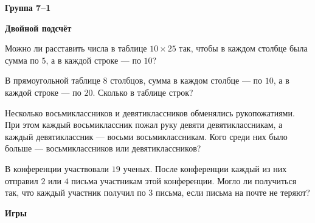 \documentclass{article}
\begin{document}
    \large

    \begin{center}
        \textbf{Группа 7--1}
    \end{center}

    \begin{center}
        \textbf{Двойной подсчёт}
    \end{center}

    \begin{enumerate_boxed}

        \item Можно ли расставить числа в таблице $10 \times 25$ так, чтобы в каждом столбце была сумма по $5$, а в каждой строке — по $10$?

        \item В прямоугольной таблице $8$ столбцов, сумма в каждом столбце — по $10$, а в каждой строке — по $20$.
        Сколько в таблице строк?

        \item Несколько восьмиклассников и девятиклассников обменялись рукопожатиями.
        При этом каждый восьмиклассник пожал руку девяти девятиклассникам, а каждый девятиклассник — восьми восьмиклассникам.
        Кого среди них было больше — восьмиклассников или девятиклассников?

        \item В конференции участвовали $19$ ученых.
        После конференции каждый из них отправил $2$ или $4$ письма участникам этой конференции.
        Могло ли получиться так, что каждый участник получил по $3$ письма, если письма на почте не теряют?

    \end{enumerate_boxed}


    \begin{center}
        \textbf{Игры}
    \end{center}
\end{document}
